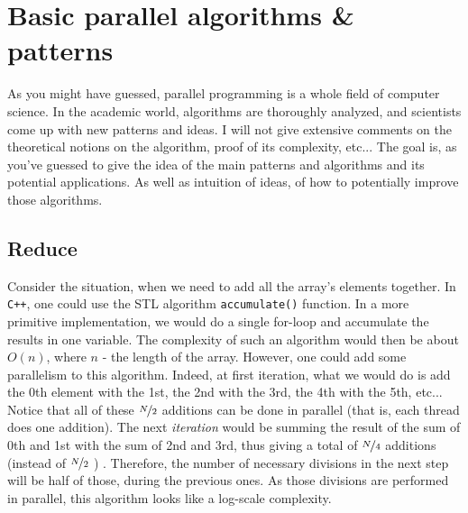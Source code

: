 
\section{Basic parallel algorithms \& patterns}

As you might have guessed, parallel programming is a whole field of computer 
science. In the academic world, algorithms are thoroughly analyzed, and scientists come up with new patterns and ideas. I will not give extensive 
comments on the theoretical notions on the algorithm, proof of its complexity, etc... 
The goal is, as you've guessed to give the idea of the main patterns and algorithms and its potential 
applications. As well as intuition of ideas, of how to potentially improve those algorithms.

\subsection{Reduce}
Consider the situation, when we need to add all the array's elements together. In \verb|C++|, one could use 
the STL algorithm \verb|accumulate()| function. In a more primitive implementation, we would do a single for-loop 
and accumulate the results in one variable. The complexity of such an algorithm would then be about $O(n)$, where 
$n$ - the length of the array. However, one could add some parallelism to this algorithm. 
Indeed, at first iteration, what we would 
do is add the 0th element with the 1st, the 2nd with the 3rd, the 4th with the 5th, etc... Notice that 
all of these $\nicefrac{N}{2}$ additions can be done in parallel (that is, each thread does one addition). The next \textit{iteration} would be 
summing the result of the sum of 0th and 1st with the sum of 2nd and 3rd, thus giving a total of 
$\nicefrac{N}{4}$ additions (instead of $\nicefrac{N}{2}$ ) . 
Therefore, the number of necessary divisions in the next step will be half of those, during the previous ones.
As those divisions are performed in parallel, this algorithm looks like a log-scale complexity. 


